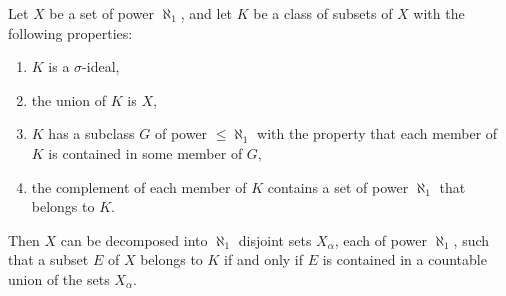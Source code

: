 Let $X$ be a set of power $\aleph_1$, and let $K$ be a class of subsets of $X$ with the following properties:

\begin{enumerate}
\item[(a)] $K$ is a $\sigma$-ideal,
\item[(b)] the union of $K$ is $X$,
\item[(c)] $K$ has a subclass $G$ of power $\leq \aleph_1$ with the property that each member of $K$ is contained in some member of $G$,
\item[(d)] the complement of each member of $K$ contains a set of power $\aleph_1$ that belongs to $K$.
\end{enumerate}

Then $X$ can be decomposed into $\aleph_1$ disjoint sets $X_{\alpha}$, each of power $\aleph_1$, such that a subset $E$ of $X$ belongs to $K$ if and only if $E$ is contained in a countable union of the sets $X_{\alpha}$.
